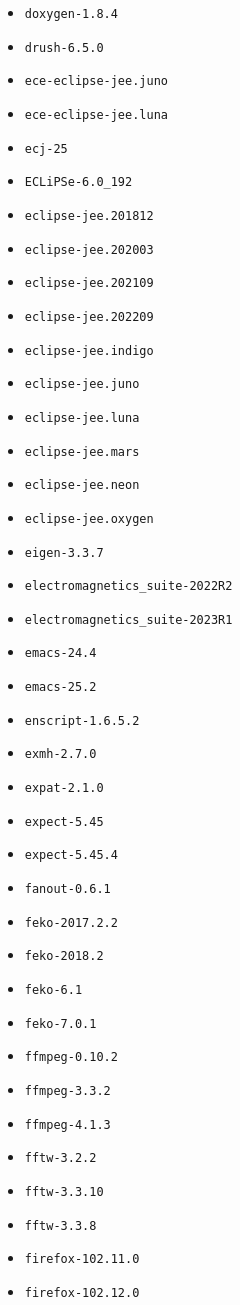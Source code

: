 \begin{itemize}
\item \verb|doxygen-1.8.4|
\item \verb|drush-6.5.0|
\item \verb|ece-eclipse-jee.juno|
\item \verb|ece-eclipse-jee.luna|
\item \verb|ecj-25|
\item \verb|ECLiPSe-6.0_192|
\item \verb|eclipse-jee.201812|
\item \verb|eclipse-jee.202003|
\item \verb|eclipse-jee.202109|
\item \verb|eclipse-jee.202209|
\item \verb|eclipse-jee.indigo|
\item \verb|eclipse-jee.juno|
\item \verb|eclipse-jee.luna|
\item \verb|eclipse-jee.mars|
\item \verb|eclipse-jee.neon|
\item \verb|eclipse-jee.oxygen|
\item \verb|eigen-3.3.7|
\item \verb|electromagnetics_suite-2022R2|
\item \verb|electromagnetics_suite-2023R1|
\item \verb|emacs-24.4|
\item \verb|emacs-25.2|
\item \verb|enscript-1.6.5.2|
\item \verb|exmh-2.7.0|
\item \verb|expat-2.1.0|
\item \verb|expect-5.45|
\item \verb|expect-5.45.4|
\item \verb|fanout-0.6.1|
\item \verb|feko-2017.2.2|
\item \verb|feko-2018.2|
\item \verb|feko-6.1|
\item \verb|feko-7.0.1|
\item \verb|ffmpeg-0.10.2|
\item \verb|ffmpeg-3.3.2|
\item \verb|ffmpeg-4.1.3|
\item \verb|fftw-3.2.2|
\item \verb|fftw-3.3.10|
\item \verb|fftw-3.3.8|
\item \verb|firefox-102.11.0|
\item \verb|firefox-102.12.0|

\end{itemize}
